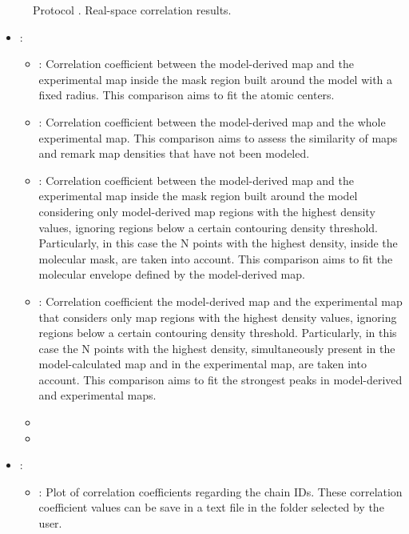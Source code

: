 \begin{itemize}
\begin{itemize}
\begin{figure}[H]
         \caption{Protocol . Real-space correlation results.}
         \label{fig:validationCryoEM_protocol_5}
        \end{figure}
        \begin{itemize}
         \item {} \citep{afonine2018b}: 
         \begin{itemize}  
          \item {}: Correlation coefficient between the model-derived map and the experimental map inside the mask region built around the model with a fixed radius. This comparison aims to fit the atomic centers.
          \item {}: Correlation coefficient between the model-derived map and the whole experimental map. This comparison aims to assess the similarity of maps and remark map densities that have not been modeled.
          \item {}: Correlation coefficient between the model-derived map and the experimental map inside the mask region built around the model considering only model-derived map regions with the highest density values, ignoring regions below a certain contouring density threshold. Particularly, in this case the N points with the highest density, inside the molecular mask, are taken into account. This comparison aims to fit the molecular envelope defined by the model-derived map.
          \item {}: Correlation coefficient the model-derived map and the experimental map that considers only map regions with the highest density values, ignoring regions below a certain contouring density threshold. Particularly, in this case the N points with the highest density, simultaneously present in the model-calculated map and in the experimental map, are taken into account. This comparison aims to fit the strongest peaks in model-derived and experimental maps.
          \item {}
          \item {}
         \end{itemize}
         \item {}:
         \begin{itemize}
           \item {}: Plot of correlation coefficients regarding the chain IDs. These correlation coefficient values can be save in a text file in the folder selected by the user.

\end{itemize}
\end{itemize}
\end{itemize}
\end{itemize}

